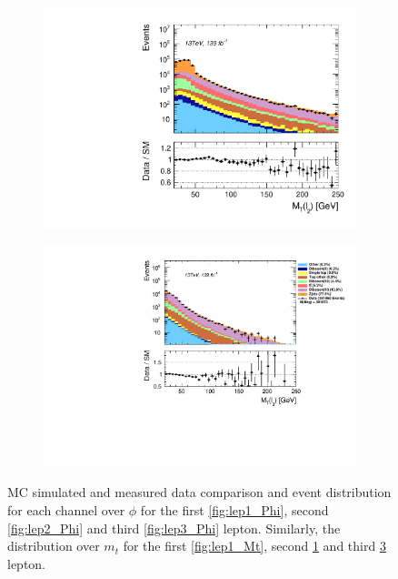 \begin{figure}[H]
{\begin{subfigure}{.405\textwidth}
        \includegraphics[width=\textwidth]{Figures/FeaturesHistograms/lep2_Mt.pdf}
        \caption{}
        \label{fig:lep2_Mt}
    \end{subfigure}
    \hfill
    \begin{subfigure}{.525\textwidth}
        \includegraphics[width=\textwidth]{Figures/FeaturesHistograms/lep3_Mt.pdf}
        \caption{}
        \label{fig:lep3_Mt}
    \end{subfigure}
    }
    \caption[\ac{MC} simulated and measured data comparison and event distribution for each channel over $\phi$ for the first, 
    second and third lepton. Similarly, the distribution over $m_t$ for the first, second and third lepton.]{\ac{MC} simulated and measured data 
    comparison and event distribution for each channel over $\phi$ for the first \ref{fig:lep1_Phi}, 
    second \ref{fig:lep2_Phi} and third \ref{fig:lep3_Phi} lepton. Similarly, the distribution over $m_t$
    for the first \ref{fig:lep1_Mt}, second \ref{fig:lep2_Mt} and third \ref{fig:lep3_Mt} lepton.}
\end{figure}
